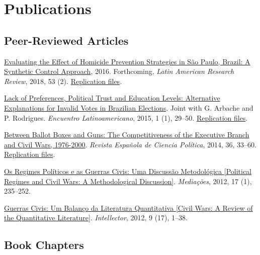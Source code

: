 \documentclass[letterpaper]{article}
\renewenvironment{itemize}{
  \begin{list}{}{
    \setlength{\leftmargin}{1.5em}
  }
}{
  \end{list}
}
\begin{document}
\section*{Publications}

\subsection*{Peer-Reviewed Articles}

\begin{itemize}
	\item \href{https://osf.io/8tmhe/}{Evaluating the Effect of Homicide Prevention Strategies in S\~{a}o Paulo, Brazil: A Synthetic Control Approach}, 2016. Forthcoming, \textit{Latin American Research Review}, 2018, 53 (2). \href{https://github.com/danilofreire/homicides-sp-synth}{Replication files}.
	\item \href{http://www.iapss.org/wp-content/uploads/2014/10/ELA1.1_2.Lack-of-Preferences-Political-Trust-and-Education-Levels.pdf}{Lack of Preferences, Political Trust and Education Levels: Alternative Explanations for Invalid Votes in Brazilian Elections}. Joint with G. Arbache and P. Rodrigues. \textit{Encuentro Latinoamericano}, 2015, 1 (1), 29--50. \href{https://github.com/danilofreire/invalid-votes-brazil}{Replication files}.
	\item \href{http://recyt.fecyt.es/index.php/recp/article/view/37638}{Between Ballot Boxes and Guns: The Competitiveness of the Executive Branch and Civil Wars, 1976-2000}. \textit{Revista Espa\~{n}ola de Ciencia Pol\'{i}tica}, 2014, 36, 33--60. \href{http://dx.doi.org/10.7910/DVN/NSDUYG}{Replication files}.
	\item \href{http://www.uel.br/revistas/uel/index.php/mediacoes/article/view/12617/10995}{Os Regimes Pol\'{i}ticos e as Guerras Civis: Uma Discuss\~{a}o Metodol\'{o}gica {[}Political Regimes and Civil Wars: A Methodological Discussion{]}}. \textit{Media\c{c}\~{o}es}, 2012, 17 (1), 235--252.
	\item \href{http://www.revistaintellector.cenegri.org.br/ed2012-17/danilofreire-2012-17.pdf}{Guerras Civis: Um Balan\c{c}o da Literatura Quantitativa {[}Civil Wars: A Review of the Quantitative Literature{]}}. \textit{Intellector}, 2012, 9 (17), 1--38.
\end{itemize}

\subsection*{Book Chapters}
\end{document}
